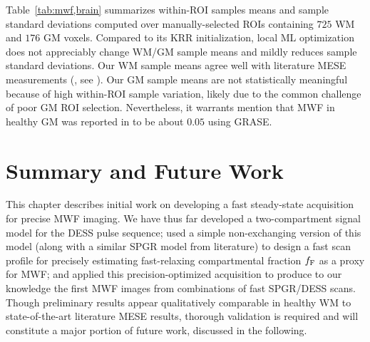 Table~\ref{tab:mwf,brain} summarizes 
within-ROI samples means and sample standard deviations
computed over manually-selected ROIs 
containing $725$ WM and $176$ GM voxels.
Compared to its KRR initialization,
local ML optimization
does not appreciably change 
WM/GM \ffest sample means
and mildly reduces sample standard deviations.
Our WM \ffest sample means
agree well with literature MESE measurements
(\eg, see \cite[Fig.~3]{zhang:15:com}).
Our GM \ffest sample means
are not statistically meaningful
because of high within-ROI sample variation,
likely due to the common challenge
of poor GM ROI selection.
Nevertheless,
it warrants mention 
that MWF in healthy GM 
was reported in \cite[Fig.~3]{zhang:15:com}
to be about $0.05$ using GRASE.

\section{Summary and Future Work}
\label{s,mwf,summ}

This chapter describes initial work 
on developing a fast steady-state acquisition
for precise MWF imaging.
We have thus far developed
a two-compartment signal model 
for the DESS pulse sequence;
used a simple non-exchanging version 
of this model 
(along with a similar SPGR model
from literature)
to design a fast scan profile
for precisely estimating 
fast-relaxing compartmental fraction $f_{\mathrm{F}}$
as a proxy for MWF;
and applied this precision-optimized acquisition
\invivo to produce to our knowledge the first MWF images 
from combinations of fast SPGR/DESS scans.
Though preliminary results appear qualitatively comparable
in healthy WM
to state-of-the-art literature MESE results,
thorough validation is required
and will constitute a major portion 
of future work,
discussed in the following.

